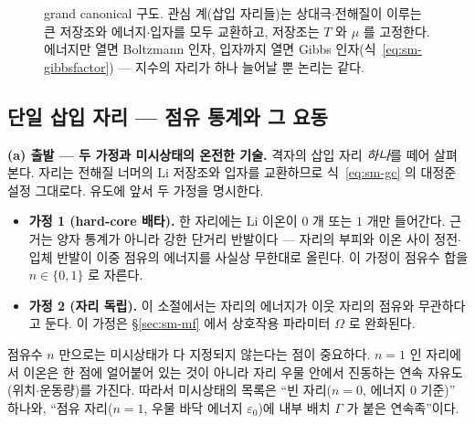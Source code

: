 \documentclass[11pt,a4paper]{article}
\begin{document}
\begin{figure}[t]
\centering
{}
\caption{grand canonical 구도. 관심 계(삽입 자리들)는 상대극$\cdot$전해질이 이루는 큰 저장조와
에너지$\cdot$입자를 모두 교환하고, 저장조는 $T$ 와 $\mu$ 를 고정한다. 에너지만 열면 Boltzmann 인자, 입자까지
열면 Gibbs 인자(식~\eqref{eq:sm-gibbsfactor}) --- 지수의 자리가 하나 늘어날 뿐 논리는 같다.}
\label{fig:sm-reservoir}
\end{figure}

\subsection{단일 삽입 자리 --- 점유 통계와 그 요동}\label{sec:sm-site}
\textbf{(a) 출발 --- 두 가정과 미시상태의 온전한 기술.} 격자의 삽입 자리 \emph{하나}를 떼어 살펴본다.
자리는 전해질 너머의 Li 저장조와 입자를 교환하므로 식~\eqref{eq:sm-gc} 의 대정준 설정 그대로다. 유도에
앞서 두 가정을 명시한다.
\begin{itemize}[leftmargin=2.2em,itemsep=0.1em]
\item \textbf{가정 1 (hard-core 배타).} 한 자리에는 Li 이온이 $0$ 개 또는 $1$ 개만 들어간다. 근거는 양자
통계가 아니라 강한 단거리 반발이다 --- 자리의 부피와 이온 사이 정전$\cdot$입체 반발이 이중 점유의
에너지를 사실상 무한대로 올린다. 이 가정이 점유수 합을 $n\in\{0,1\}$ 로 자른다.
\item \textbf{가정 2 (자리 독립).} 이 소절에서는 자리의 에너지가 이웃 자리의 점유와 무관하다고 둔다.
이 가정은 \S\ref{sec:sm-mf} 에서 상호작용 파라미터 $\Omega$ 로 완화된다.
\end{itemize}
점유수 $n$ 만으로는 미시상태가 다 지정되지 않는다는 점이 중요하다. $n=1$ 인 자리에서 이온은 한 점에
얼어붙어 있는 것이 아니라 자리 우물 안에서 진동하는 연속 자유도(위치$\cdot$운동량)를 가진다. 따라서
미시상태의 목록은 ``빈 자리($n=0$, 에너지 $0$ 기준)'' 하나와, ``점유 자리($n=1$, 우물 바닥 에너지
$\varepsilon_0$)에 내부 배치 $\Gamma$ 가 붙은 연속족''이다.
\end{document}

